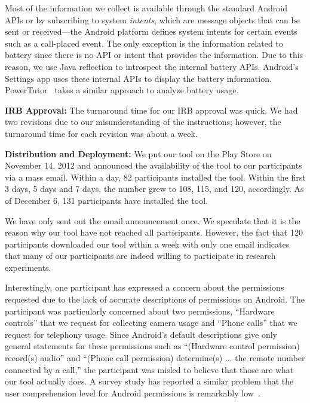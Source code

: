 Most of the information we collect is available through the standard Android
APIs or by subscribing to system {\it intents}, which are message objects that
can be sent or received---the Android platform defines system intents for
certain events such as a call-placed event. The only exception is the
information related to battery since there is no API or intent that provides the
information. Due to this reason, we use Java reflection to introspect the
internal battery APIs. Android's Settings app uses these internal APIs to
display the battery information. PowerTutor~\cite{zhang:codes:2010} takes a
similar approach to analyze battery usage.

{\bf IRB Approval:} The turnaround time for our IRB approval
was quick. We had two revisions due to our misunderstanding of the instructions;
however, the turnaround time for each revision was about a week.

{\bf Distribution and Deployment:} We put our tool on the Play Store on
November 14, 2012 and announced the availability of the tool to our
participants via a mass email. Within a day, 82 participants installed the
tool. Within the first 3 days, 5 days and 7 days, the number grew to 108,
115, and 120, accordingly. As of December 6, 131 participants have installed the
tool. 

We have only sent out the email announcement once. We speculate that it is the
reason why our tool have not reached all participants. However, the fact that
120 participants downloaded our tool within a week with only one email indicates
that many of our participants are indeed willing to participate in research
experiments.

Interestingly, one participant has expressed a concern about the permissions
requested due to the lack of accurate descriptions of permissions on Android.
The participant was particularly concerned about two permissions, ``Hardware
controls'' that we request for collecting camera usage and ``Phone calls'' that
we request for telephony usage. Since Android's default descriptions give only
general statements for these permissions such as ``(Hardware control permission)
record(s) audio'' and ``(Phone call permission) determine(s) ... the remote
number connected by a call,'' the participant was misled to believe that those
are what our tool actually does. A survey study has reported a similar problem
that the user comprehension level for Android permissions is remarkably
low~\cite{felt:soups:2012}.

